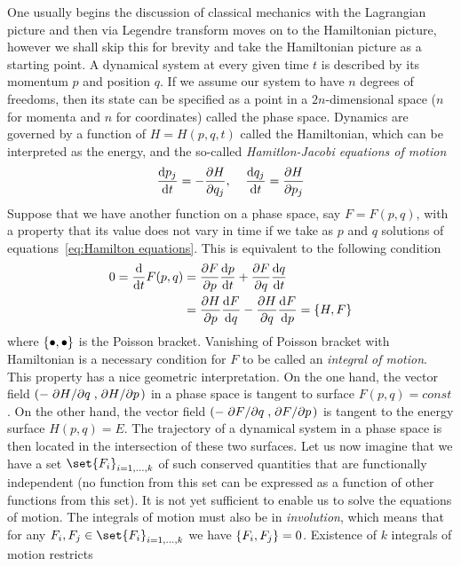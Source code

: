One usually begins the discussion of classical mechanics with the Lagrangian picture and then
via Legendre transform moves on to the Hamiltonian picture, however we shall skip this
for brevity and take the Hamiltonian picture as a starting point.
A dynamical system at every given time \(t\) is described by its momentum \(p\) and
position \(q\). If we assume our system to have \(n\) degrees of freedoms, then
its state can be specified as a point in a \(2n\)-dimensional space (\(n\) for momenta and
\(n\) for coordinates) called the phase space. Dynamics are governed by a function
of \(H = H(p,q,t)\) called the Hamiltonian, which can be interpreted as the energy,
and the so-called \textit{Hamitlon-Jacobi equations of motion}
\begin{equation}
    \dv{p_j}{t} = -\pdv{H}{q_j},\;\;\;\; \dv{q_j}{t} = \pdv{H}{p_j}
    \label{eq:Hamilton equations}
\end{equation} 
Suppose that we have another function on a phase space, say \(F=F(p,q)\), with
a property that its value does not vary in time if we take as \(p\) and \(q\) solutions
of equations~\eqref{eq:Hamilton equations}. This is equivalent to the following condition
\begin{align}
    0 = \dv{}{t}F(p,q) &= \pdv{F}{p} \dv{p}{t} + \pdv{F}{q}\dv{q}{t} \nonumber\\
    &= \pdv{H}{p}\dv{F}{q} - \pdv{H}{q}\dv{F}{p} = \poissonbracket{H}{F}
\end{align}
where \(\poissonbracket{\bullet }{\bullet }\) is the Poisson bracket.
Vanishing of Poisson bracket with Hamiltonian is a necessary condition for \(F\)
to be called an \textit{integral of motion}. This property has a nice geometric interpretation.
On the one hand, the vector field \(\left(-\pdv*{H}{q},\pdv*{H}{p}\right)\) in a phase space is
tangent to surface \(F(p,q) = const\). On the other hand, the vector field 
\(\left(-\pdv*{F}{q},\pdv*{F}{p}\right)\) is tangent to the energy surface \(H(p,q) = E\).
The trajectory of a dynamical system in a phase space is then located in the intersection
of these two surfaces.
Let us now imagine that we have a set \(\set{F_i}_{i=1,\ldots,k}\) of such conserved
quantities that are functionally independent (no function from this set can be expressed
as a function of other functions from this set). It is not yet sufficient to enable us to solve
the equations of motion. The integrals of motion must also be in \textit{involution},
which means that for any \(F_i,F_j\in\set{F_i}_{i=1,\ldots,k}\) we have
\(\poissonbracket{F_i}{F_j} = 0\). Existence of \(k\) integrals of motion restricts
